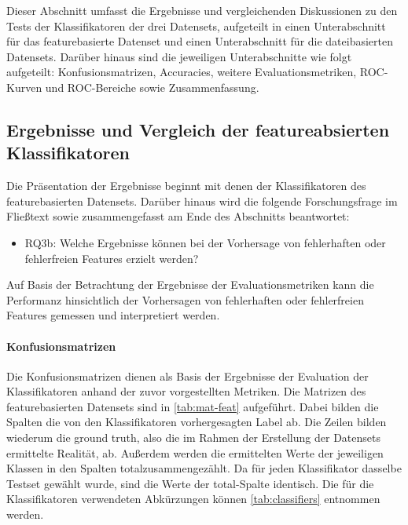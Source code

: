 Dieser Abschnitt umfasst die Ergebnisse und vergleichenden Diskussionen zu den Tests der Klassifikatoren der drei Datensets, aufgeteilt in einen Unterabschnitt für das featurebasierte Datenset und einen Unterabschnitt für die dateibasierten Datensets. Darüber hinaus sind die jeweiligen Unterabschnitte wie folgt aufgeteilt: Konfusionsmatrizen, Accuracies, weitere Evaluationsmetriken, ROC-Kurven und ROC-Bereiche sowie Zusammenfassung.

\subsection{Ergebnisse und Vergleich der featureabsierten Klassifikatoren}
\label{feat-results}

Die Präsentation der Ergebnisse beginnt mit denen der Klassifikatoren des featurebasierten Datensets. Darüber hinaus wird die folgende Forschungsfrage im Fließtext sowie zusammengefasst am Ende des Abschnitts beantwortet:
\vspace{-\topsep}
\begin{itemize}
\setlength{\itemsep}{-2pt}
 \item RQ3b: Welche Ergebnisse können bei der Vorhersage von fehlerhaften oder fehlerfreien Features erzielt werden?
\end{itemize}

Auf Basis der Betrachtung der Ergebnisse der Evaluationsmetriken kann die Performanz hinsichtlich der Vorhersagen von fehlerhaften oder fehlerfreien Features gemessen und interpretiert werden.  

\paragraph{Konfusionsmatrizen}
Die Konfusionsmatrizen dienen als Basis der Ergebnisse der Evaluation der Klassifikatoren anhand der zuvor vorgestellten Metriken. Die Matrizen des featurebasierten Datensets sind in \autoref{tab:mat-feat} aufgeführt. Dabei bilden die Spalten die von den Klassifikatoren vorhergesagten Label ab. Die Zeilen bilden wiederum die \glqq ground truth\grqq{}, also die im Rahmen der Erstellung der Datensets ermittelte Realität, ab. Außerdem werden die ermittelten Werte der jeweiligen Klassen in den Spalten \glqq total\grqq zusammengezählt. Da für jeden Klassifikator dasselbe Testset gewählt wurde, sind die Werte der \glqq total\grqq-Spalte identisch. Die für die Klassifikatoren verwendeten Abkürzungen können \autoref{tab:classifiers} entnommen werden.

